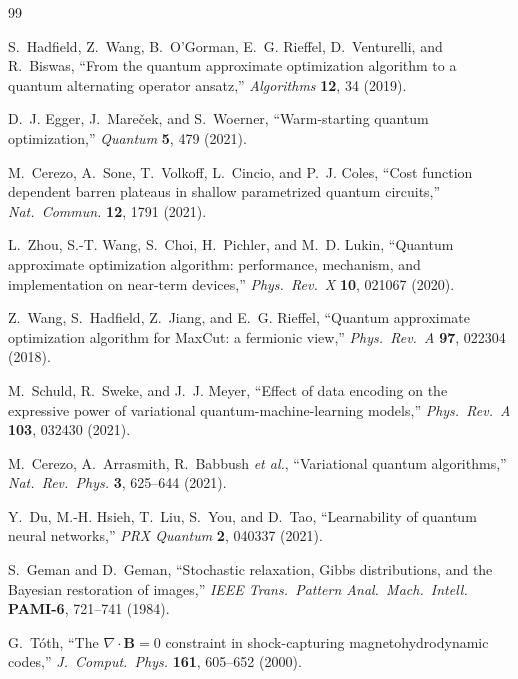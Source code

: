 \documentclass[12pt, a4paper, oneside]{report}
\begin{document}
\begin{thebibliography}{99}

S.~Hadfield, Z.~Wang, B.~O'Gorman, E.~G. Rieffel, D.~Venturelli, and R.~Biswas, ``From the quantum approximate optimization algorithm to a quantum alternating operator ansatz,'' \textit{Algorithms} \textbf{12}, 34 (2019).

D.~J. Egger, J.~Mare\v{c}ek, and S.~Woerner, ``Warm-starting quantum optimization,'' \textit{Quantum} \textbf{5}, 479 (2021).

M.~Cerezo, A.~Sone, T.~Volkoff, L.~Cincio, and P.~J. Coles, ``Cost function dependent barren plateaus in shallow parametrized quantum circuits,'' \textit{Nat.\ Commun.} \textbf{12}, 1791 (2021).

L.~Zhou, S.-T. Wang, S.~Choi, H.~Pichler, and M.~D. Lukin, ``Quantum approximate optimization algorithm: performance, mechanism, and implementation on near-term devices,'' \textit{Phys.\ Rev.\ X} \textbf{10}, 021067 (2020).

Z.~Wang, S.~Hadfield, Z.~Jiang, and E.~G. Rieffel, ``Quantum approximate optimization algorithm for MaxCut: a fermionic view,'' \textit{Phys.\ Rev.\ A} \textbf{97}, 022304 (2018).


M.~Schuld, R.~Sweke, and J.~J. Meyer, ``Effect of data encoding on the expressive power of variational quantum-machine-learning models,'' \textit{Phys.\ Rev.\ A} \textbf{103}, 032430 (2021).

M.~Cerezo, A.~Arrasmith, R.~Babbush \textit{et al.}, ``Variational quantum algorithms,'' \textit{Nat.\ Rev.\ Phys.} \textbf{3}, 625--644 (2021).

Y.~Du, M.-H. Hsieh, T.~Liu, S.~You, and D.~Tao, ``Learnability of quantum neural networks,'' \textit{PRX Quantum} \textbf{2}, 040337 (2021).

S.~Geman and D.~Geman, ``Stochastic relaxation, Gibbs distributions, and the Bayesian restoration of images,'' \textit{IEEE Trans.\ Pattern Anal.\ Mach.\ Intell.} \textbf{PAMI-6}, 721--741 (1984).

G.~T\'oth, ``The $\nabla \!\cdot\! \mathbf{B} = 0$ constraint in shock-capturing magnetohydrodynamic codes,'' \textit{J.\ Comput.\ Phys.} \textbf{161}, 605--652 (2000).

\end{thebibliography}
\end{document}
